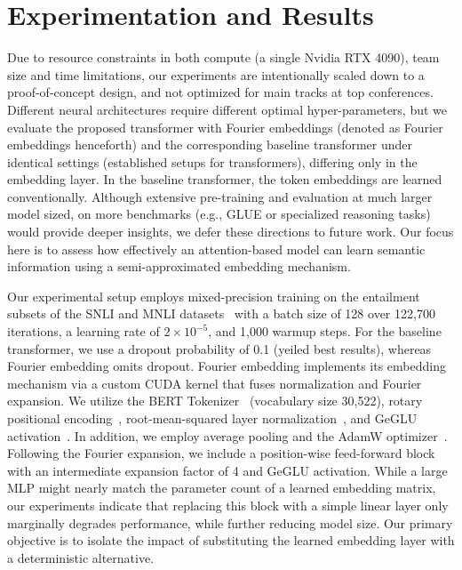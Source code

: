 \documentclass{article}
\begin{document}
\section{Experimentation and Results}
Due to resource constraints in both compute (a single Nvidia RTX 4090), team size and time limitations, our experiments are intentionally scaled down to a proof-of-concept design, and not optimized for main tracks at top conferences. Different neural architectures require different optimal hyper-parameters, but we evaluate the proposed transformer with Fourier embeddings (denoted as Fourier embeddings henceforth) and the corresponding baseline transformer under identical settings (established setups for transformers), differing only in the embedding layer. In the baseline transformer, the token embeddings are learned conventionally. Although extensive pre-training and evaluation at much larger model sized, on more benchmarks (e.g., GLUE or specialized reasoning tasks) would provide deeper insights, we defer these directions to future work. Our focus here is to assess how effectively an attention-based model can learn semantic information using a semi-approximated embedding mechanism.

Our experimental setup employs mixed-precision training on the entailment subsets of the SNLI and MNLI datasets~\cite{snli,mnli} with a batch size of 128 over 122,700 iterations, a learning rate of \(2\times10^{-5}\), and 1,000 warmup steps. For the baseline transformer, we use a dropout probability of 0.1 (yeiled best results), whereas Fourier embedding omits dropout. Fourier embedding implements its embedding mechanism via a custom CUDA kernel that fuses normalization and Fourier expansion. We utilize the BERT Tokenizer~\cite{devlin2019bert} (vocabulary size 30,522), rotary positional encoding~\cite{su2021rotary}, root-mean-squared layer normalization~\cite{liu2020rmsnorm}, and GeGLU activation~\cite{shazeer2020glu}. In addition, we employ average pooling and the AdamW optimizer~\cite{loshchilov2019decoupled}. Following the Fourier expansion, we include a position-wise feed-forward block with an intermediate expansion factor of 4 and GeGLU activation. While a large MLP might nearly match the parameter count of a learned embedding matrix, our experiments indicate that replacing this block with a simple linear layer only marginally degrades performance, while further reducing model size. Our primary objective is to isolate the impact of substituting the learned embedding layer with a deterministic alternative.
\end{document}
